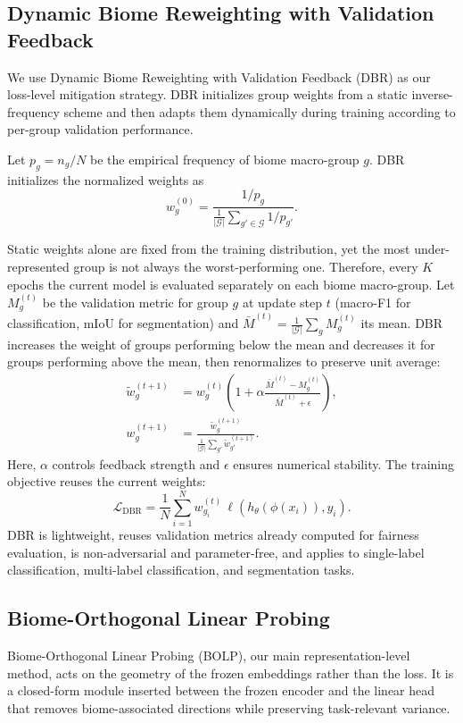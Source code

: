 \documentclass[10pt,twocolumn,letterpaper]{article}
\begin{document}
\subsection{Dynamic Biome Reweighting with Validation Feedback}

We use Dynamic Biome Reweighting with Validation Feedback (DBR) as our loss-level mitigation strategy. DBR initializes group weights from a static inverse-frequency scheme and then adapts them dynamically during training according to per-group validation performance.

Let \(p_g = n_g / N\) be the empirical frequency of biome macro-group \(g\). DBR initializes the normalized weights as
\begin{equation}
w_g^{(0)}=\frac{1/p_g}{\frac{1}{|\mathcal{G}|}\sum_{g'\in\mathcal{G}}1/p_{g'}}\label{eq:wg}.
\end{equation}

Static weights alone are fixed from the training distribution, yet the most under-represented group is not always the worst-performing one. Therefore, every \(K\) epochs the current model is evaluated separately on each biome macro-group. Let \(M_g^{(t)}\) be the validation metric for group \(g\) at update step \(t\) (macro-F1 for classification, mIoU for segmentation) and \(\bar{M}^{(t)}=\frac{1}{|\mathcal{G}|}\sum_g M_g^{(t)}\) its mean. DBR increases the weight of groups performing below the mean and decreases it for groups performing above the mean, then renormalizes to preserve unit average:
\begin{align}
\tilde{w}^{(t+1)}_g &= w^{(t)}_g \left(1 + \alpha \frac{\bar{M}^{(t)} - M_g^{(t)}}{\bar{M}^{(t)} + \epsilon}\right), \\
w^{(t+1)}_g &= \frac{\tilde{w}^{(t+1)}_g}{\frac{1}{|\mathcal{G}|}\sum_{g'} \tilde{w}^{(t+1)}_{g'}}.
\end{align}
Here, \(\alpha\) controls feedback strength and \(\epsilon\) ensures numerical stability. The training objective reuses the current weights:
\begin{equation}
\mathcal{L}_{\mathrm{DBR}} = \frac{1}{N} \sum_{i=1}^N w^{(t)}_{g_i} \, \ell(h_\theta(\phi(x_i)), y_i).
\end{equation}
DBR is lightweight, reuses validation metrics already computed for fairness evaluation, is non-adversarial and parameter-free, and applies to single-label classification, multi-label classification, and segmentation tasks.

\subsection{Biome-Orthogonal Linear Probing}
Biome-Orthogonal Linear Probing (BOLP), our main representation-level method, acts on the geometry of the frozen embeddings rather than the loss. It is a closed-form module inserted between the frozen encoder and the linear head that removes biome-associated directions while preserving task-relevant variance.
\end{document}
